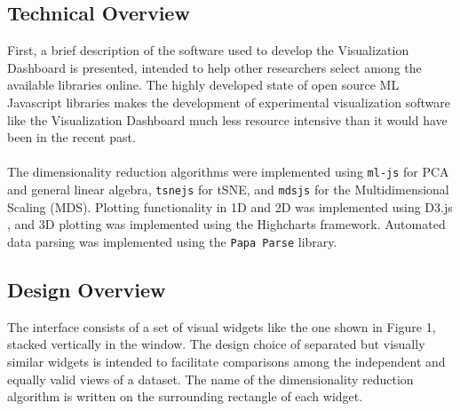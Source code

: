 \documentclass{sigchi}
\begin{document}
\subsection{Technical Overview}
First, a brief description of the software used to develop the Visualization Dashboard is presented, intended to help other researchers select among the available libraries online. %
%
The highly developed state of open source ML Javascript libraries makes the development of experimental visualization software like the Visualization Dashboard much less resource intensive than it would have been in the recent past.%
%
\\\\
%
The dimensionality reduction algorithms were implemented using \texttt{ml-js} \cite{mljs} for PCA and general linear algebra, \texttt{tsnejs} \cite{tSNEJS} for tSNE, and \texttt{mdsjs} \cite{mdsjs} for the Multidimensional Scaling (MDS). %
%
Plotting functionality in 1D and 2D was implemented using D3.js \cite{d3js}, and 3D plotting was implemented using the Highcharts \cite{highcharts} framework. %
%
Automated data parsing was implemented using the \texttt{Papa Parse} \cite{papaparse} library.
%

\subsection{Design Overview}
The interface consists of a set of visual widgets like the one shown in Figure 1, stacked vertically in the window. %
%
The design choice of separated but visually similar widgets is intended to facilitate comparisons among the independent and equally valid views of a dataset. %
%
The name of the dimensionality reduction algorithm is written on the surrounding rectangle of each widget. %
%
\end{document}
